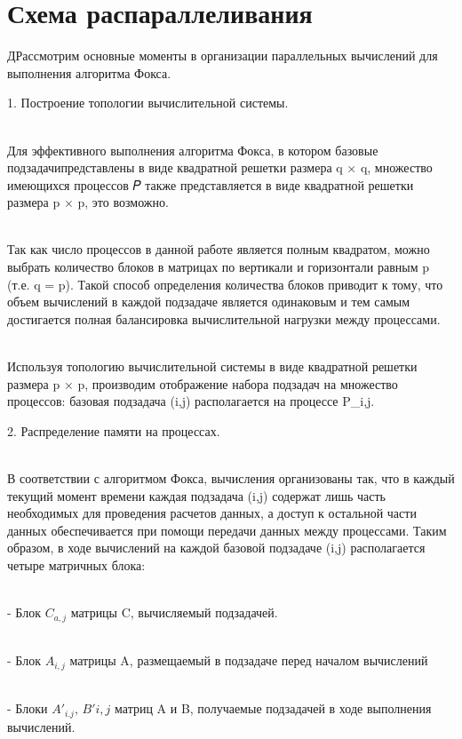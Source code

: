\documentclass{report}
\begin{document}
\section*{Схема распараллеливания}
ДРассмотрим основные моменты в организации параллельных вычислений для выполнения
алгоритма Фокса. 
\par 1. Построение топологии вычислительной системы.
\par \\ Для эффективного выполнения алгоритма Фокса, в котором базовые подзадачипредставлены в виде квадратной решетки размера q × q, множество имеющихся процессов 𝑃 также представляется в виде квадратной решетки размера p × p, это возможно.
\par \\ Так как число процессов в данной работе является полным квадратом, можно выбрать количество блоков в матрицах по вертикали и горизонтали равным p (т.е. q = p). Такой способ определения количества блоков приводит к тому, что объем вычислений в каждой подзадаче является одинаковым и тем самым достигается полная балансировка вычислительной нагрузки между процессами.
\par \\ Используя топологию вычислительной системы в виде квадратной решетки
размера p × p, производим отображение набора подзадач на множество процессов:
базовая подзадача (i,j) располагается на процессе P_{i,j}.

\par 2. Распределение памяти на процессах.
\par \\ В соответствии с алгоритмом Фокса, вычисления организованы так, что в
каждый текущий момент времени каждая подзадача (i,j) содержат лишь часть
необходимых для проведения расчетов данных, а доступ к остальной части данных
обеспечивается при помощи передачи данных между процессами. Таким образом, в
ходе вычислений на каждой базовой подзадаче (i,j) располагается четыре матричных
блока:
\par \\ - \quad  Блок \begin{math}C_{a,j} \end{math} матрицы C, вычисляемый подзадачей.
\par \\ - \quad  Блок \begin{math}A_{i,j} \end{math} матрицы A, размещаемый в подзадаче перед началом вычислений
\par \\ - \quad Блоки  \begin{math}A'_{i.j}, \, B'{i,j} \end{math} матриц A и B, получаемые подзадачей в ходе выполнения вычислений.
 
\end{document}
